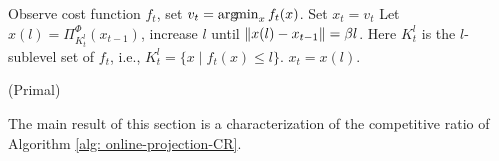 \begin{algorithm}[t]
	\begin{algorithmic}[1]
                  \STATE Observe cost function $f_t$, set $v_t = \operatorname*{arg\!min}_{x} f_t(x)$.
            \STATE Set $x_t = v_t$ 
            \ELSE
			\STATE Let $x(l) = \Pi_{K_t^l}^\Phi (x_{t-1})$,
            increase $l$ until $\left\lVert x(l) - x_{t-1} \right\rVert = \beta l$. Here $K_t^l$ is the $l$-sublevel set of $f_t$, i.e., $K_t^l = \{ x \mid f_t(x) \le l\}$. 
			\label{projection-step-cr}
            \STATE $x_t = x(l)$.
            \ENDIF
			\ENDFOR
	\end{algorithmic}
\caption{(Primal) \ouralg}
\label{alg: online-projection-CR}
\end{algorithm}





 

The main result of this section is a characterization of the competitive ratio of Algorithm \ref{alg: online-projection-CR}.




